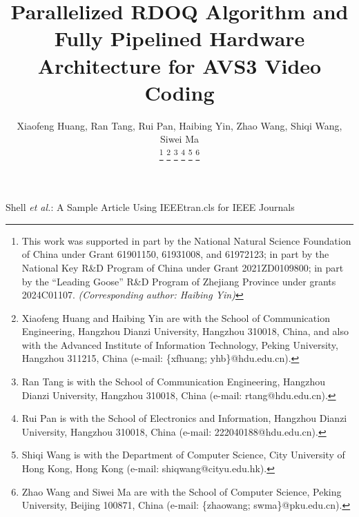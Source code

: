 \documentclass[lettersize,journal]{IEEEtran}
\begin{document}
\title{Parallelized RDOQ Algorithm and Fully Pipelined Hardware Architecture for AVS3 Video Coding}

\author{Xiaofeng Huang, Ran Tang, Rui Pan, Haibing Yin, Zhao Wang, Shiqi Wang, Siwei Ma

\thanks{This work was supported in part by the National Natural Science Foundation of China under Grant 61901150, 61931008, and 61972123; in part by the National Key R\&D Program of China under Grant 2021ZD0109800; in part by the “Leading Goose” R\&D Program of Zhejiang Province under grants 2024C01107. \textit{(Corresponding author: Haibing Yin)}}%
\thanks{Xiaofeng Huang and Haibing Yin are with the School of Communication Engineering, Hangzhou Dianzi University, Hangzhou 310018, China, and also with the Advanced Institute of Information Technology, Peking University, Hangzhou 311215, China (e-mail: \{xfhuang; yhb\}@hdu.edu.cn).}
\thanks{Ran Tang is with the School of Communication Engineering, Hangzhou Dianzi University,
Hangzhou 310018, China (e-mail: rtang@hdu.edu.cn).}
\thanks{Rui Pan is with the School of Electronics and Information, Hangzhou Dianzi University, Hangzhou 310018, China (e-mail: 222040188@hdu.edu.cn).}
\thanks{Shiqi Wang is with the Department of Computer Science, City University of Hong Kong, Hong Kong (e-mail: shiqwang@cityu.edu.hk).}
\thanks{Zhao Wang and Siwei Ma are with the School of Computer Science, Peking University, Beijing 100871, China (e-mail: \{zhaowang; swma\}@pku.edu.cn).}
}

%
{Shell \MakeLowercase{\textit{et al.}}: A Sample Article Using IEEEtran.cls for IEEE Journals}


\maketitle
\end{document}
